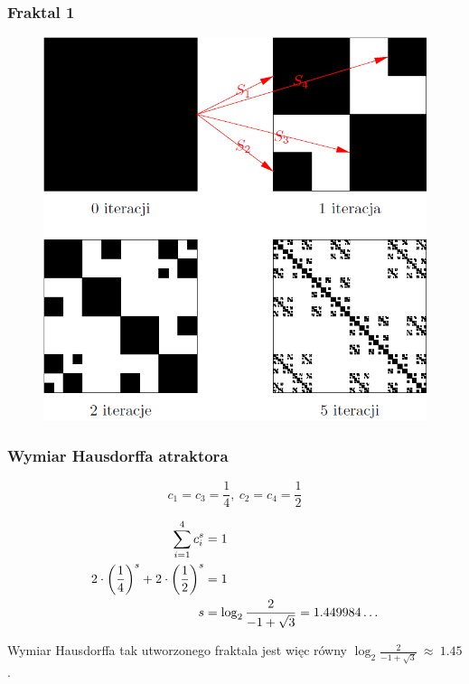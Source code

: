 \documentclass[11pt,usenames,dvipsnames,svgnames,x11names]{beamer}
\theoremstyle{plain}
\theoremstyle{definition}
\theoremstyle{remark}
\begin{document}
\begin{frame}
\frametitle{Fraktal 1}
	\begin{center}
		\begin{figure}[htbp]
			\includegraphics[scale=0.3]{serwetka.jpg}
		\end{figure}
	\end{center}
\end{frame}

\begin{frame}
\frametitle{Wymiar Hausdorffa atraktora}
$$c_1=c_3=\frac{1}{4},~c_2=c_4=\frac{1}{2}$$

$$
\aligned
\sum_{i=1}^4 c_i^s&=1\\
2\cdot \left(\frac{1}{4}\right)^s+2\cdot\left(\frac{1}{2}\right)^s&=1\\
s&=\log_2 \frac{2}{-1+\sqrt{3}}= 1.449984\ldots\\
\endaligned
$$

Wymiar Hausdorffa tak utworzonego fraktala jest więc równy $\log_2 \frac{2}{-1+\sqrt{3}}~\approx~1.45$.
\end{frame}
\end{document}
